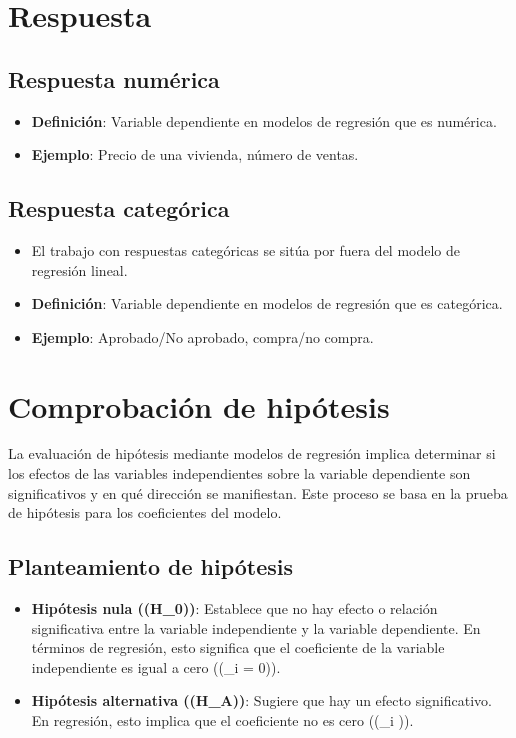 \documentclass[
  letterpaper,
  DIV=11,
  numbers=noendperiod]{scrreprt}
\providecommand{\tightlist}{%
  \setlength{\itemsep}{0pt}\setlength{\parskip}{0pt}}\usepackage{longtable,booktabs,array}
\begin{document}
\section{Respuesta}\label{respuesta}

\subsection{Respuesta numérica}\label{respuesta-numuxe9rica}

\begin{itemize}
\tightlist
\item
  \textbf{Definición}: Variable dependiente en modelos de regresión que
  es numérica.
\item
  \textbf{Ejemplo}: Precio de una vivienda, número de ventas.
\end{itemize}

\subsection{Respuesta categórica}\label{respuesta-categuxf3rica}

\begin{itemize}
\tightlist
\item
  El trabajo con respuestas categóricas se sitúa por fuera del modelo de
  regresión lineal.
\item
  \textbf{Definición}: Variable dependiente en modelos de regresión que
  es categórica.
\item
  \textbf{Ejemplo}: Aprobado/No aprobado, compra/no compra.
\end{itemize}

\section{Comprobación de
hipótesis}\label{comprobaciuxf3n-de-hipuxf3tesis}

La evaluación de hipótesis mediante modelos de regresión implica
determinar si los efectos de las variables independientes sobre la
variable dependiente son significativos y en qué dirección se
manifiestan. Este proceso se basa en la prueba de hipótesis para los
coeficientes del modelo.

\subsection{Planteamiento de
hipótesis}\label{planteamiento-de-hipuxf3tesis}

\begin{itemize}
\tightlist
\item
  \textbf{Hipótesis nula ((H\_0))}: Establece que no hay efecto o
  relación significativa entre la variable independiente y la variable
  dependiente. En términos de regresión, esto significa que el
  coeficiente de la variable independiente es igual a cero ((\beta\_i =
  0)).
\item
  \textbf{Hipótesis alternativa ((H\_A))}: Sugiere que hay un efecto
  significativo. En regresión, esto implica que el coeficiente no es
  cero ((\beta\_i )).
\end{itemize}
\end{document}
